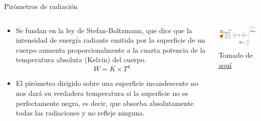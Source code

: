 \documentclass[aspectratio=169]{beamer}
\begin{document}
\begin{frame}{Pirómetros de radiación}
    \begin{columns}[c, onlytextwidth]
        \begin{column}{0.55\textwidth}
            \begin{itemize}
                \item Se fundan en la ley de Stefan-Boltzmann, que dice que la intensidad de energía radiante emitida por la superficie de un cuerpo aumenta proporcionalmente a la cuarta potencia de la temperatura absoluta (Kelvin) del cuerpo.
                \begin{equation*}
                    W= K \times T^4
                \end{equation*}
                \item El pirómetro dirigido sobre una superficie incandescente no nos dará su verdadera temperatura si la superficie no es perfectamente negra, es decir, que absorba absolutamente todas las radiaciones y no refleje ninguna.
            \end{itemize}
        \end{column}
        \begin{column}{0.45\textwidth}
            \includegraphics[width=7cm]{fig/pirometro-basico.jpg}
            \\ \tiny{Tomado de \href{https://www.ingmecafenix.com/otros/pirometro/}{aquí}}
        \end{column}
    \end{columns}
\end{frame}
\end{document}
